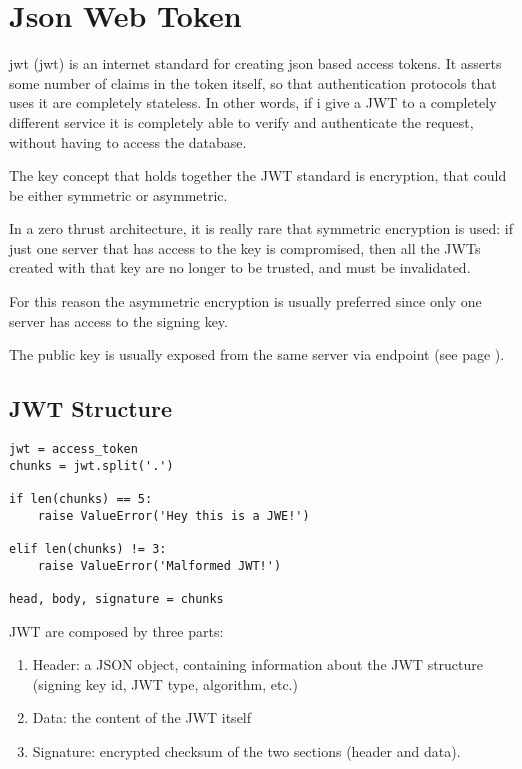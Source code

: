\section{Json Web Token}
\label{jwt}
\acs{jwt} (\acl{jwt}) is an internet standard for creating \acs{json} based access tokens.
It asserts some number of claims in the token itself, so that authentication
protocols that uses it are completely stateless.
In other words, if i give a JWT to a completely different service it is
completely able to verify and authenticate the request, without having to access
the database.

The key concept that holds together the JWT standard is encryption, that could
be either symmetric or asymmetric.

In a zero thrust architecture, it is really rare that symmetric encryption is
used: if just one server that has access to the key is compromised, then all the
JWTs created with that key are no longer to be trusted, and must be invalidated.

For this reason the asymmetric encryption is usually preferred since only one
server has access to the signing key.

The public key is usually exposed from the same server via endpoint (see page
\pageref{jwks}).

\subsection{JWT Structure}
\begin{lstlisting}
jwt = access_token
chunks = jwt.split('.')

if len(chunks) == 5:
    raise ValueError('Hey this is a JWE!')

elif len(chunks) != 3:
    raise ValueError('Malformed JWT!')

head, body, signature = chunks
\end{lstlisting}

JWT are composed by three  parts:

\begin{enumerate}
    \item Header: a JSON object, containing information about the JWT structure
        (signing key id, JWT type, algorithm, etc.)
    \item Data: the content of the JWT itself
    \item Signature: encrypted checksum of the two sections (header and data).
\end{enumerate}

